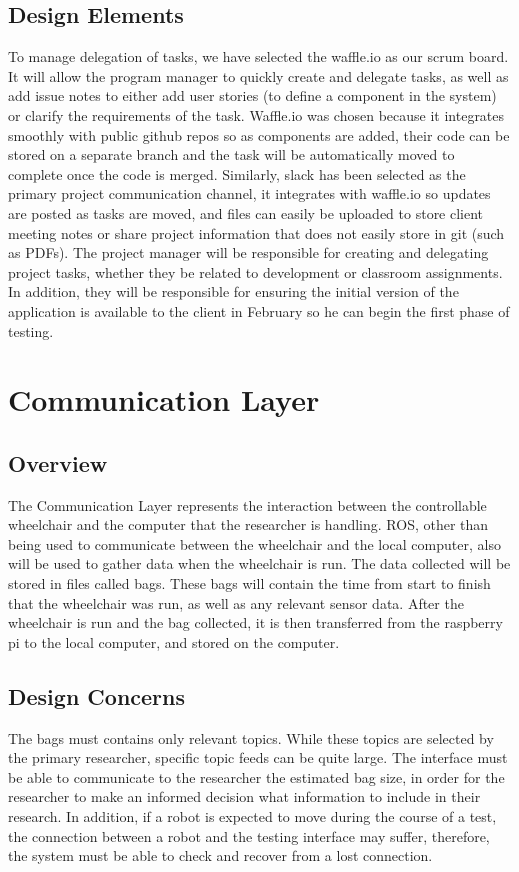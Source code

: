\documentclass[onecolumn, draftclsnofoot,10pt, compsoc]{report}
\begin{document}
\subsection{Design Elements}
To manage delegation of tasks, we have selected the waffle.io as our scrum board. It will allow the program manager to quickly create and delegate tasks, as well as add issue notes to either add user stories (to define a component in the system) or clarify the requirements of the task. Waffle.io was chosen because it integrates smoothly with public github repos so as components are added, their code can be stored on a separate branch and the task will be automatically moved to complete once the code is merged. Similarly, slack has been selected as the primary project communication channel, it integrates with waffle.io so updates are posted as tasks are moved, and files can easily be uploaded to store client meeting notes or share project information that does not easily store in git (such as PDFs). The project manager will be responsible for creating and delegating project tasks, whether they be related to development or classroom assignments. In addition, they will be responsible for ensuring the initial version of the application is available to the client in February so he can begin the first phase of testing. 

\section{Communication Layer}

\subsection{Overview}
The Communication Layer represents the interaction between the controllable wheelchair and the computer that the researcher is handling.  ROS, other than being used to communicate between the wheelchair and the local computer, also will be used to gather data when the wheelchair is run. The data collected will be stored in files called bags. These bags will contain the time from start to finish that the wheelchair was run, as well as any relevant sensor data. After the wheelchair is run and the bag collected, it is then transferred from the raspberry pi to the local computer, and stored on the computer.

\subsection{Design Concerns}
The bags must contains only relevant topics. While these topics are selected by the primary researcher, specific topic feeds can be quite large. The interface must be able to communicate to the researcher the estimated bag size, in order for the researcher to make an informed decision what information to include in their research. In addition, if a robot is expected to move during the course of a test, the connection between a robot and the testing interface may suffer, therefore, the system must be able to check and recover from a lost connection.
\end{document}
